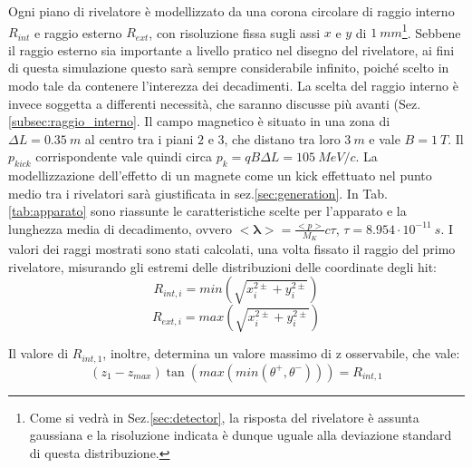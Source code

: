 \documentclass[8pt]{extarticle}
\begin{document}
Ogni piano di rivelatore è modellizzato da una corona circolare di raggio interno $R_{int}$ e raggio esterno $R_{ext}$, con risoluzione fissa sugli assi $x$ e $y$ di $1\ mm$\footnote{Come si vedrà in Sez.\ref{sec:detector}, la risposta del rivelatore è assunta gaussiana e la risoluzione indicata è dunque uguale alla deviazione standard di questa distribuzione.}. Sebbene il raggio esterno sia importante a livello pratico nel disegno del rivelatore, ai fini di questa simulazione questo sarà sempre considerabile infinito, poiché scelto in modo tale da contenere l'interezza dei decadimenti. La scelta del raggio interno è invece soggetta a differenti necessità, che saranno discusse più avanti (Sez. \ref{subsec:raggio_interno}. Il campo magnetico è situato in una zona di $\Delta L = 0.35\ m$ al centro tra i piani $2$ e $3$, che distano tra loro $3\ m$ e vale $B = 1\ T$. Il $p_{kick}$ corrispondente vale quindi circa $p_k = qB\Delta L = 105\ MeV/c$. La modellizzazione dell'effetto di un magnete come un kick effettuato nel punto medio tra i rivelatori sarà giustificata in sez.\ref{sec:generation}. In Tab.\ref{tab:apparato} sono riassunte le caratteristiche scelte per l'apparato e la lunghezza media di decadimento, ovvero $\mathbf{<\lambda>} = \frac{<p>}{M_{K}} c \tau$, $\tau = 8.954 \cdot 10^{-11} \ s$. I valori dei raggi mostrati sono stati calcolati, una volta fissato il raggio del primo rivelatore, misurando gli estremi delle distribuzioni delle coordinate degli hit: 
$$
R_{int, i} = min(\sqrt{x_i^{2 \pm} + y_i^{2 \pm}})
$$
$$
R_{ext, i} = max(\sqrt{x_i^{2 \pm} + y_i^{2 \pm}})
$$

Il valore di $R_{int, 1}$, inoltre, determina un valore massimo di z osservabile, che vale: \\
$$
(z_1 - z_{max})\tan{(max(min(\theta^+, \theta^-)))} = R_{int,1}
$$

\bigskip
\end{document}
